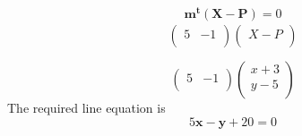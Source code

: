 \documentclass[10pt, a4paper]{article}
\let\vec\mathbf
\begin{document}
\begin{eqnarray}
\vec{m^t\vec{(X-P)}}=0
\end{eqnarray}
\begin{equation}
\begin{pmatrix}
    5 &-1\\
\end{pmatrix}\begin{pmatrix}
    X-P\\
\end{pmatrix}
    \label{eq-3}
\end{equation}

\begin{equation}
 \begin{pmatrix}
    5 & -1\\
\end{pmatrix}\begin{pmatrix}
    x+3\\
    y-5\\
\end{pmatrix}
\label{eq-4}
\end{equation}
The required line equation is 
\begin{equation}
 5\vec{x}-\vec{y}+20=0
\label{eq-5}
\end{equation}
\end{document}

